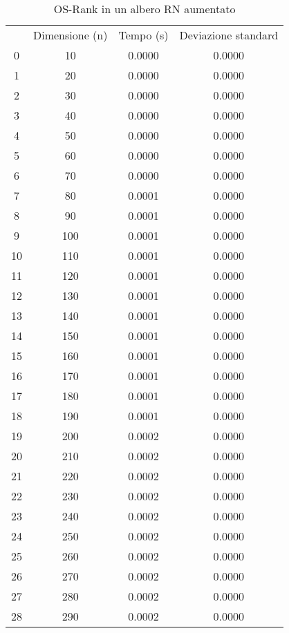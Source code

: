 \begin{table}[H]
\centering
\caption{OS-Rank in un albero RN aumentato}
\label{OS-Rank in un albero RN aumentato}
\begin{tabular}{cccc}
 & Dimensione (n) & Tempo (s) & Deviazione standard \\
0 & 10 & 0.0000 & 0.0000 \\
\cline{1-4}
1 & 20 & 0.0000 & 0.0000 \\
\cline{1-4}
2 & 30 & 0.0000 & 0.0000 \\
\cline{1-4}
3 & 40 & 0.0000 & 0.0000 \\
\cline{1-4}
4 & 50 & 0.0000 & 0.0000 \\
\cline{1-4}
5 & 60 & 0.0000 & 0.0000 \\
\cline{1-4}
6 & 70 & 0.0000 & 0.0000 \\
\cline{1-4}
7 & 80 & 0.0001 & 0.0000 \\
\cline{1-4}
8 & 90 & 0.0001 & 0.0000 \\
\cline{1-4}
9 & 100 & 0.0001 & 0.0000 \\
\cline{1-4}
10 & 110 & 0.0001 & 0.0000 \\
\cline{1-4}
11 & 120 & 0.0001 & 0.0000 \\
\cline{1-4}
12 & 130 & 0.0001 & 0.0000 \\
\cline{1-4}
13 & 140 & 0.0001 & 0.0000 \\
\cline{1-4}
14 & 150 & 0.0001 & 0.0000 \\
\cline{1-4}
15 & 160 & 0.0001 & 0.0000 \\
\cline{1-4}
16 & 170 & 0.0001 & 0.0000 \\
\cline{1-4}
17 & 180 & 0.0001 & 0.0000 \\
\cline{1-4}
18 & 190 & 0.0001 & 0.0000 \\
\cline{1-4}
19 & 200 & 0.0002 & 0.0000 \\
\cline{1-4}
20 & 210 & 0.0002 & 0.0000 \\
\cline{1-4}
21 & 220 & 0.0002 & 0.0000 \\
\cline{1-4}
22 & 230 & 0.0002 & 0.0000 \\
\cline{1-4}
23 & 240 & 0.0002 & 0.0000 \\
\cline{1-4}
24 & 250 & 0.0002 & 0.0000 \\
\cline{1-4}
25 & 260 & 0.0002 & 0.0000 \\
\cline{1-4}
26 & 270 & 0.0002 & 0.0000 \\
\cline{1-4}
27 & 280 & 0.0002 & 0.0000 \\
\cline{1-4}
28 & 290 & 0.0002 & 0.0000 \\

\end{tabular}
\end{table}
